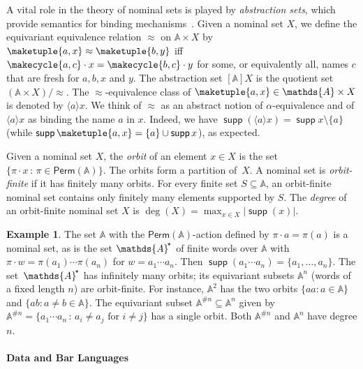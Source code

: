 \documentclass[10pt,a4paper]{amsart}
\theoremstyle{definition}
\newtheorem{example}[theo]{Example}
\newcommand{\seq}{\subseteq}
\newcommand{\At}{\mathds{A}}
\newcommand{\Ats}{\At^{\!\raisebox{1pt}{\scriptsize$\star$}}}
\DeclareMathOperator{\supp}{\mathsf{supp}}
\newcommand{\Perm}{\mathsf{Perm}}
\newcommand{\names}{\At}
\newcommand{\Abstr}[2][\names]{[#1]#2}
\newcommand{\braket}[1]{\langle #1 \rangle}
\newcommand{\set}[1]{\{#1\}}
\newcommand{\setw}[2]{\{#1\,:\,#2\}}
\newcommand{\quotient}[2]{#1/{#2}} %
\begin{document}
A vital role in the theory of nominal sets is played by \emph{abstraction sets}, which provide semantics for binding mechanisms~\cite{gp99}.
Given a nominal set $X$, we define the equivariant equivalence relation $\approx$ on $\names \times X$ by $\maketuple{a,x} \approx \maketuple{b,y}$ iff $\makecycle{a,c} \cdot x=\makecycle{b,c} \cdot y$ for some, or equivalently all, names $c$ that are fresh for $a, b, x$ and $y$.
The abstraction set $\Abstr{X}$ is the quotient set $\quotient{(\names\times X)}{\approx}$. The $\approx$-equivalence
class of $\maketuple{a,x} \in \names \times X$ is denoted by $\braket{a}x$.
We think of $\approx$ as an abstract notion of $\alpha$-equivalence and of $\braket{a}x$ as binding the name $a$ in $x$.
Indeed, we have $\supp(\braket{a}x) = \supp x \setminus \set{a}$ (while $\supp\maketuple{a,x} =
\set{a} \cup \supp x$), as expected. %

Given a nominal set $X$, the \emph{orbit} of an element $x\in X$ is the set  $\setw{\pi\cdot x}{\pi \in \Perm(\names)}$.
The orbits form a partition of~$X$.
A nominal set is \emph{orbit-finite} if it has finitely many orbits. For every finite set $S\seq\names$, an orbit-finite nominal set contains only finitely many elements supported by $S$. The \emph{degree} of an orbit-finite nominal set $X$ is  $\deg(X) = \max_{x\in X} |\supp(x)|$. 

\begin{example}
  The set $\names$ with the $\Perm(\names)$-action defined by $\pi\cdot a = \pi(a)$ is a nominal set, as is the set $\Ats$ of finite words over $\names$ with $\pi\cdot w=\pi(a_1)\cdots\pi(a_n)$ for $w=a_1\cdots a_n$.
  Then $\supp(a_1\cdots a_n)=\{a_1,\ldots,a_n\}$. The set~$\Ats$ has infinitely many orbits;
  its equivariant subsets $\names^n$ (words of a fixed length $n$) are orbit-finite.
  For instance, $\names^2$ has the two orbits $\{aa: a\in \names\}$ and $\{ab: a\neq b\in \names\}$.
    The equivariant subset $\At^{\#n}\seq \At^n$ given by $\names^{\#n} = \setw{a_1\cdots a_n}{a_i\neq a_j
    \text{ for $i\neq j$}}$ has a single orbit. Both $\names^{\# n}$ and $\names^n$ have degree $n$.
\end{example}

\paragraph*{Data and Bar Languages}
\end{document}
